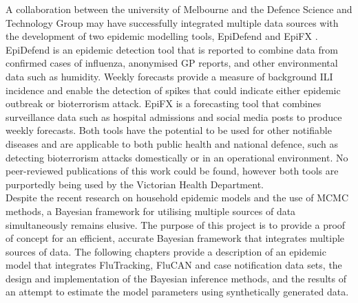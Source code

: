 A collaboration between the university of Melbourne and the Defence Science and Technology Group may have successfully integrated multiple data sources with the development of two epidemic modelling tools, EpiDefend and EpiFX \cite{McCaw et al 2018}. EpiDefend is an epidemic detection tool that is reported to combine data from confirmed cases of influenza, anonymised GP reports, and other environmental data such as humidity. Weekly forecasts provide a measure of background ILI incidence and enable the detection of spikes that could indicate either epidemic outbreak or bioterrorism attack. EpiFX is a forecasting tool that combines surveillance data such as hospital admissions and social media posts to produce weekly forecasts. Both tools have the potential to be used for other notifiable diseases and are applicable to both public health and national defence, such as detecting bioterrorism attacks domestically or in an operational environment. No peer-reviewed publications of this work could be found, however both tools are purportedly being used by the Victorian Health Department.\\
Despite the recent research on household epidemic models and the use of MCMC methods, a Bayesian framework for utilising multiple sources of data simultaneously remains elusive. The purpose of this project is to provide a proof of concept for an efficient, accurate Bayesian framework that integrates multiple sources of data. The following chapters provide a description of an epidemic model that integrates FluTracking, FluCAN and case notification data sets, the design and implementation of the Bayesian inference methods, and the results of an attempt to estimate the model parameters using synthetically generated data.


